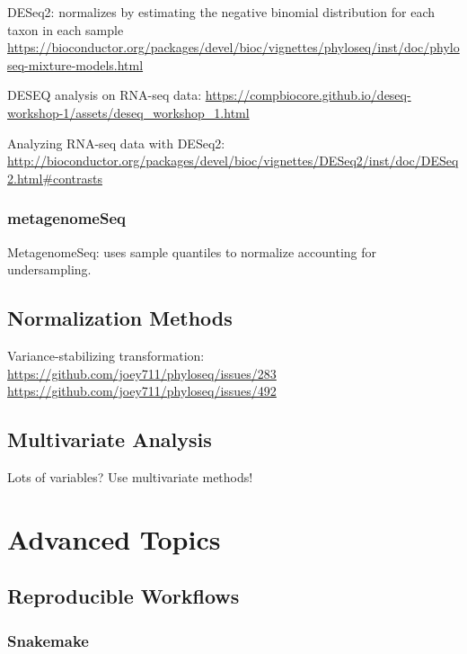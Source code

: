\documentclass[
]{book}
\begin{document}
DESeq2: normalizes by estimating the negative binomial distribution for each taxon in each sample
\url{https://bioconductor.org/packages/devel/bioc/vignettes/phyloseq/inst/doc/phyloseq-mixture-models.html}

DESEQ analysis on RNA-seq data:
\url{https://compbiocore.github.io/deseq-workshop-1/assets/deseq_workshop_1.html}

Analyzing RNA-seq data with DESeq2:
\url{http://bioconductor.org/packages/devel/bioc/vignettes/DESeq2/inst/doc/DESeq2.html\#contrasts}

\hypertarget{metagenomeseq}{%
\section{metagenomeSeq}\label{metagenomeseq}}

MetagenomeSeq: uses sample quantiles to normalize accounting for undersampling.

\hypertarget{normalization-methods}{%
\chapter{Normalization Methods}\label{normalization-methods}}

Variance-stabilizing transformation:
\url{https://github.com/joey711/phyloseq/issues/283}
\url{https://github.com/joey711/phyloseq/issues/492}

\hypertarget{multivariate-analysis}{%
\chapter{Multivariate Analysis}\label{multivariate-analysis}}

Lots of variables? Use multivariate methods!

\hypertarget{part-advanced-topics}{%
\part{Advanced Topics}\label{part-advanced-topics}}

\hypertarget{reproducible-workflows}{%
\chapter{Reproducible Workflows}\label{reproducible-workflows}}

\hypertarget{snakemake}{%
\section{Snakemake}\label{snakemake}}
\end{document}
